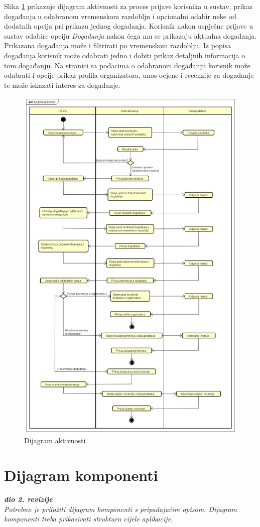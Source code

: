 			
			 Slika \ref{ad} prikazuje dijagram aktivnosti za proces prijave korisnika u sustav, prikaz događanja u odabranom vremenskom razdoblju i opcionalni odabir neke od dodatnih opcija pri prikazu jednog događanja. Korisnik nakon uspješne prijave u sustav odabire opciju \textit{Događanja} nakon čega mu se prikazuju aktualna događanja. Prikazana događanja može i filtrirati po vremenskom razdoblju. Iz popisa događanja korisnik može odabrati jedno i dobiti prikaz detaljnih informacija o tom događanju. Na stranici sa podacima o odabranom događanju korisnik može odabrati i opcije prikaz profila organizatora, unos ocjene i recenzije za događanje te može iskazati interes za događanje. 
			 
			 \begin{figure}[H]
			 	\vspace{-0.8cm}
			 	\includegraphics[width=\textwidth]{dijagrami/ad.png} 
			 	\centering
			 	\vspace{-1cm}
			 	\caption{Dijagram aktivnosti}
			 	\label{ad}
			 \end{figure}
			
			\eject
		\section{Dijagram komponenti}
		
			\textbf{\textit{dio 2. revizije}}\\
		
			 \textit{Potrebno je priložiti dijagram komponenti s pripadajućim opisom. Dijagram komponenti treba prikazivati strukturu cijele aplikacije.}